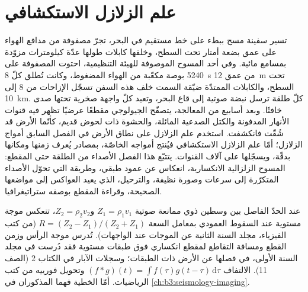 \chapter{علم الزلازل الاستكشافي}\label{ch:b3:exploration-seismology}

تسير سفينة مسح ببطء على خط مستقيم في البحر، تجرّ مصفوفة من
مدافع الهواء على عمق بضعة أمتار تحت السطح، وخلفها كابلات طولها عدّة
كيلومترات مزوّدة بمسامع مائية. وفي أحد المسوح الموصوفة للهيئة التنظيمية،
احتوت المصفوفة على \num{5240} بوصة مكعّبة من الهواء المضغوط، وكانت تُطلق كلّ
\qty{8}{s} من عمق \qty{12}{m} تحت السطح، والكابلات الممتدّة ضيّقة السمت
خلف هذه السفن تسجّل الإزاحات من 8 إلى \qty{10}{km}.
كلّ طلقة ترسل نبضة صوتية إلى قاع البحر، وتعيد كلّ واجهة صخرية
تحتها صدى خافتًا. وبعد أسابيع من المعالجة، يتصفّح الجيولوجي
مقطعًا عرضيًا تظهر فيه قنوات الأنهار المدفونة والكتل الصدعية المائلة،
والحشوة ذات  لحوض قديم، كأنّما الأرض قد شُقّت فانكشفت.
استخدم علم الزلازل على نطاق الأرض في الفصل السابق أمواج
الزلازل؛ أمّا علم الزلازل الاستكشافي فيُنتج أمواجه الخاصّة، بمصادر يُعرف
زمنها ومكانها بدقّة، ويسجّلها على آلاف القنوات. يتتبّع هذا
الفصل الأصداء من الطلقة حتى المقطع: المسوح الزلزالية الانكسارية،
انعكاس  عن عمود طبقي، وطريقة 
التي تحوّل الأصداء المتكرّرة إلى سرعات وصورة نظيفة، والترحيل، الذي
يعيد العواكس إلى مواضعها الصحيحة، وقراءة المقطع بوصفه
ستراتيغرافيا.

\begin{recall}
عند الحدّ الفاصل بين وسطين ذوي ممانعة صوتية $Z_1 = \rho_1v_1$
و$Z_2 = \rho_2v_2$، تنعكس موجة مستوية عند السقوط العمودي بمعامل السعة
$R = (Z_2 - Z_1)/(Z_2 + Z_1)$ (من كتب الفيزياء، مجلد السنة الثانية
عن الموجات عند الواجهات). تُدرس موجة الرأس وزمن القطع ومسافة التقاطع
لمقطع انكساري فوق طبقات مستوية فقد دُرست في
مجلد السنة الأولى، في فصلها عن الأرض ذات الطبقات؛ وسجلات الآبار في الكتاب 2
(الصف 11). الالتفاف $(f*g)(t) = \int f(\tau)g(t - \tau)\,\mathrm d\tau$
وتحويل فورييه من كتب الرياضيات. أمّا   الخطية
فهما المذكوران في \cref{ch:b3:seismology-imaging}.
\end{recall}

